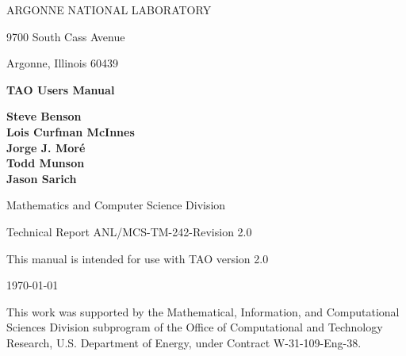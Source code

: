 
\vspace{1.75in}

\begin{center}

ARGONNE NATIONAL LABORATORY

9700 South Cass Avenue

Argonne, Illinois  60439

\vspace{1.5in}

{\Large
{\bf 
TAO Users Manual
}
}

\vspace{.5in}

{\bf Steve Benson \\ Lois Curfman McInnes \\ Jorge J. Mor\'e \\ Todd Munson \\ Jason Sarich}

\vspace{.5in}

Mathematics and Computer Science Division

\vspace{.25in}

Technical Report  ANL/MCS-TM-242-Revision 2.0

\vspace{.25in}

This manual is intended for use with TAO version 2.0

\vspace{1.0in}

\today
\end{center}

\vspace{1.5in}

\par\noindent
This work was supported by the Mathematical, Information,
and Computational Sciences Division subprogram of the
Office of Computational and Technology Research,
U.S. Department of Energy, under Contract W-31-109-Eng-38.

